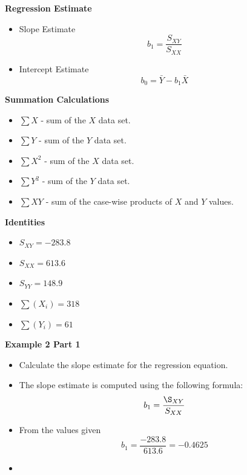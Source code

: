 \documentclass[]{report}
\begin{document}
	\noindent \textbf{Regression Estimate}

	\begin{itemize}
		\item Slope Estimate
		\[b_1 = \frac{S_{XY}}{S_{XX}} \]
		\item Intercept Estimate
		\[b_0 = \bar{Y} - b_1\bar{X} \]
	\end{itemize}
	

	
	\begin{framed}
		\noindent \textbf{Summation Calculations}
		\begin{multicols}{2}
			\begin{itemize}
				\item $\sum X$ - sum of the $X$ data set.
				\item $\sum Y$ - sum of the $Y$ data set.
				\item $\sum X^2$ - sum of the $X$ data set.
				\item $\sum Y^2$ - sum of the $Y$ data set.
				\item $\sum XY$ - sum of the case-wise products  of $X$ and $Y$ values.
			\end{itemize}
		\end{multicols}
	\end{framed}

	
	\noindent \textbf{Identities}
	\begin{multicols}{2}
	\begin{itemize}
		\item $S_{XY} = -283.8$
		\item $S_{XX} = 613.6$
		\item $S_{YY} = 148.9$
		\item $\sum(X_i)  = 318 $
		\item $\sum(Y_i)  = 61$
	\end{itemize}
	\end{multicols}

	
	
	\noindent \textbf{Example 2 Part 1}
	
	\begin{itemize}
		\item Calculate the slope estimate for the regression equation.
		\item The slope estimate is computed using the following formula:
		\[ b_1 = \frac{\S_{XY}}{S_{XX}} \]
		\item From the values given
		\[ b_1 = \frac{-283.8}{613.6} =-0.4625 \]
		\item 
	\end{itemize}
	
\end{document}
